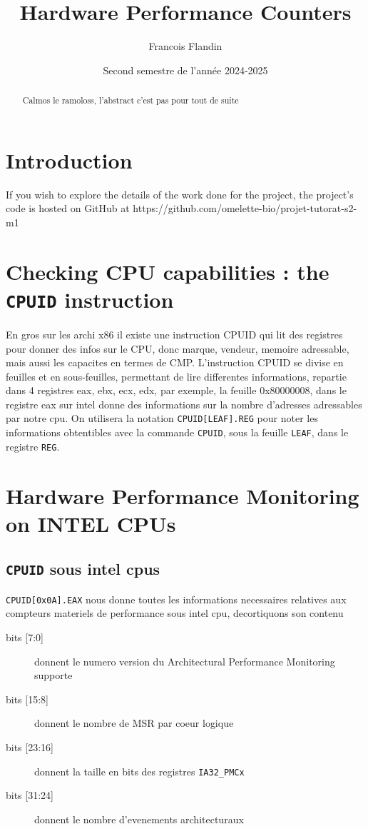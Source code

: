 \documentclass{rapport}
\title{Hardware Performance Counters}
\author{Francois Flandin}
\date{Second semestre de l'année 2024-2025}
\begin{document}
  \maketitle

  \begin{abstract}
    Calmos le ramoloss, l'abstract c'est pas pour tout de suite
  \end{abstract}

  \clearpage
  \tableofcontents
  \clearpage
  \section{Introduction}
  If you wish to explore the details of the work done for the project, the project's code is hosted on GitHub at https://github.com/omelette-bio/projet-tutorat-s2-m1

  \clearpage


  \section{Checking CPU capabilities : the \texttt{CPUID} instruction}

  En gros sur les archi x86 il existe une instruction CPUID qui lit des registres pour donner des infos sur le CPU, donc marque, vendeur, memoire adressable, mais aussi les capacites en termes de CMP.
  L'instruction CPUID se divise en feuilles et en sous-feuilles, permettant de lire differentes informations, repartie dans 4 registres eax, ebx, ecx, edx, 
  par exemple, la feuille 0x80000008, dans le registre eax sur intel donne des informations sur la nombre d'adresses adressables par notre cpu. 
  On utilisera la notation \texttt{CPUID[LEAF].REG} pour noter les informations obtentibles avec la commande \texttt{CPUID}, sous la feuille \texttt{LEAF}, 
  dans le registre \texttt{REG}.

  
  


  	\section{Hardware Performance Monitoring on INTEL CPUs}

  	\subsection{\texttt{CPUID} sous intel cpus}

	\texttt{CPUID[0x0A].EAX} nous donne toutes les informations necessaires relatives aux compteurs materiels de performance sous intel cpu, decortiquons son contenu
	\begin{description}
		\item [bits {[7:0]}] donnent le numero version du Architectural Performance Monitoring supporte
		\item [bits {[15:8]}] donnent le nombre de MSR par coeur logique
		\item [bits {[23:16]}] donnent la taille en bits des registres \texttt{IA32\_PMCx}
		\item [bits {[31:24]}] donnent le nombre d'evenements architecturaux
	\end{description}
\end{document}
